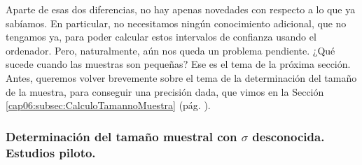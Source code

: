 Aparte de esas dos diferencias, no hay apenas novedades con respecto a lo que ya sabíamos. En
particular, no necesitamos ningún conocimiento adicional, que no tengamos ya, para poder calcular
estos intervalos de confianza usando el ordenador. Pero, naturalmente, aún nos queda un problema
pendiente. ¿Qué sucede cuando las muestras son pequeñas? Ese es el tema de la próxima sección.
Antes, queremos volver brevemente sobre el tema de la determinación del tamaño de la muestra, para
conseguir una precisión dada, que vimos en la Sección \ref{cap06:subsec:CalculoTamannoMuestra}
(pág. \pageref{cap06:subsec:CalculoTamannoMuestra}).

\subsubsection*{Determinación del tamaño muestral con $\sigma$ desconocida. Estudios piloto.}
\label{cap06:subsubsec:DeterminacionTamannoMuestraParaMuConSigmaDesconocida}

